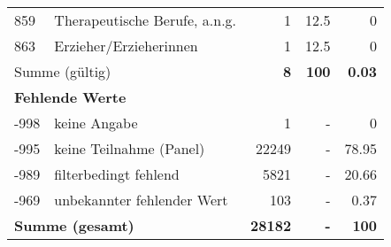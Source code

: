 \begin{longtable}{lXrrr}
     859 &
     \multicolumn{1}{X}{ Therapeutische Berufe, a.n.g.   } &


       \num{1} &
       \num[round-mode=places,round-precision=2]{12,5} &
         \num[round-mode=places,round-precision=2]{0} \\

     863 &
     \multicolumn{1}{X}{ Erzieher/Erzieherinnen   } &


       \num{1} &
       \num[round-mode=places,round-precision=2]{12,5} &
         \num[round-mode=places,round-precision=2]{0} \\
     \midrule
     \multicolumn{2}{l}{Summe (gültig)} &
       \textbf{\num{8}} &
     \textbf{100} &
       \textbf{\num[round-mode=places,round-precision=2]{0,03}} \\
     \multicolumn{5}{l}{\textbf{Fehlende Werte}}\\
       -998 &
       keine Angabe &
         \num{1} &
        - &
         \num[round-mode=places,round-precision=2]{0} \\
       -995 &
       keine Teilnahme (Panel) &
         \num{22249} &
        - &
         \num[round-mode=places,round-precision=2]{78,95} \\
       -989 &
       filterbedingt fehlend &
         \num{5821} &
        - &
         \num[round-mode=places,round-precision=2]{20,66} \\
       -969 &
       unbekannter fehlender Wert &
         \num{103} &
        - &
         \num[round-mode=places,round-precision=2]{0,37} \\
     \midrule
     \multicolumn{2}{l}{\textbf{Summe (gesamt)}} &
          \textbf{\num{28182}} &
        \textbf{-} &
        \textbf{100} \\
     \bottomrule
     \end{longtable}
     
